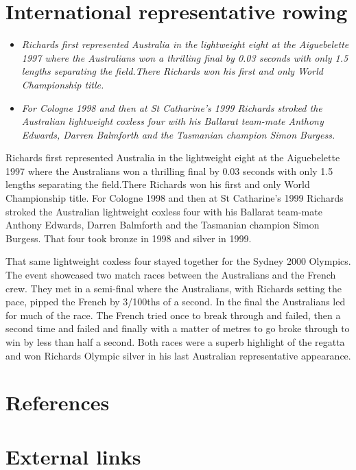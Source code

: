\section{International representative
rowing}\label{international-representative-rowing}

\begin{itemize}
\item
  \emph{Richards first represented Australia in the lightweight eight at
  the Aiguebelette 1997 where the Australians won a thrilling final by
  0.03 seconds with only 1.5 lengths separating the field.There Richards
  won his first and only World Championship title.}
\item
  \emph{For Cologne 1998 and then at St Catharine's 1999 Richards
  stroked the Australian lightweight coxless four with his Ballarat
  team-mate Anthony Edwards, Darren Balmforth and the Tasmanian champion
  Simon Burgess.}
\end{itemize}

Richards first represented Australia in the lightweight eight at the
Aiguebelette 1997 where the Australians won a thrilling final by 0.03
seconds with only 1.5 lengths separating the field.There Richards won
his first and only World Championship title. For Cologne 1998 and then
at St Catharine's 1999 Richards stroked the Australian lightweight
coxless four with his Ballarat team-mate Anthony Edwards, Darren
Balmforth and the Tasmanian champion Simon Burgess. That four took
bronze in 1998 and silver in 1999.

That same lightweight coxless four stayed together for the Sydney 2000
Olympics. The event showcased two match races between the Australians
and the French crew. They met in a semi-final where the Australians,
with Richards setting the pace, pipped the French by 3/100ths of a
second. In the final the Australians led for much of the race. The
French tried once to break through and failed, then a second time and
failed and finally with a matter of metres to go broke through to win by
less than half a second. Both races were a superb highlight of the
regatta and won Richards Olympic silver in his last Australian
representative appearance.

\section{References}\label{references}

\section{External links}\label{external-links}

